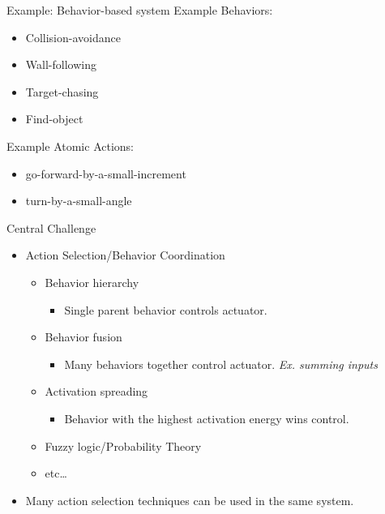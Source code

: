 \documentclass{beamer}
\begin{document}
\begin{frame}{Example: Behavior-based system}
  Example Behaviors:
  \begin{itemize}
    \item Collision-avoidance
    \item Wall-following
    \item Target-chasing
    \item Find-object
  \end{itemize}
  Example Atomic Actions:
  \begin{itemize}
    \item go-forward-by-a-small-increment
    \item turn-by-a-small-angle
  \end{itemize}
\end{frame}

\begin{frame}{Central Challenge}
 \begin{itemize}
   \item Action Selection/Behavior Coordination
   \begin{itemize}
     \item Behavior hierarchy
     \begin{itemize}
       \item Single parent behavior controls actuator.
     \end{itemize}
     \item Behavior fusion
     \begin{itemize}
       \item Many behaviors together control actuator. \emph{Ex. summing inputs}
     \end{itemize}
     \item Activation spreading
     \begin{itemize}
       \item Behavior with the highest activation energy wins control.
     \end{itemize}
     \item Fuzzy logic/Probability Theory
     \item etc\ldots
   \end{itemize}
  \item Many action selection techniques can be used in the same system.
 \end{itemize}
\end{frame}
\end{document}
